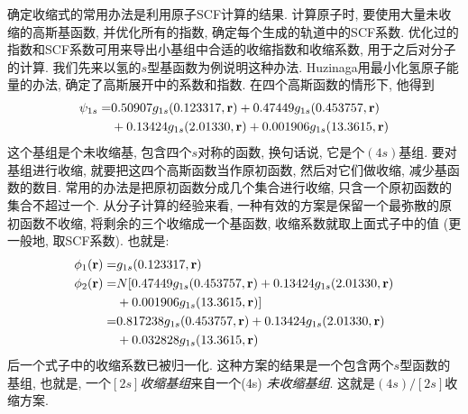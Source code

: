 {确定收缩式的常用办法是利用原子SCF计算的结果. 计算原子时, 要使用大量未收缩的高斯基函数, 并优化所有的指数, 确定每个生成的轨道中的SCF系数. 优化过的指数和SCF系数可用来导出小基组中合适的收缩指数和收缩系数, 用于之后对分子的计算. 我们先来以氢的$s$型基函数为例说明这种办法. Huzinaga用最小化氢原子能量的办法, 确定了高斯展开中的系数和指数. 在四个高斯函数的情形下, 他得到
\begin{align}
\psi_{1s} = &   0.50907g_{1s}(0.123317,\mathbf{r}) + 0.47449 g_{1s}(0.453757,\mathbf{r}) \notag\\
            & + 0.13424 g_{1s}(2.01330,\mathbf{r}) + 0.001906 g_{1s}(13.3615,\mathbf{r})
\end{align}
这个基组是个未收缩基, 包含四个$s$对称的函数, 换句话说, 它是个$(4s)$基组. 要对基组进行收缩, 就要把这四个高斯函数当作原初函数, 然后对它们做收缩, 减少基函数的数目. 常用的办法是把原初函数分成几个集合进行收缩, 只含一个原初函数的集合不超过一个. 从分子计算的经验来看, 一种有效的方案是保留一个最弥散的原初函数不收缩, 将剩余的三个收缩成一个基函数, 收缩系数就取上面式子中的值 (更一般地, 取SCF系数). 也就是:
\begin{align}
\phi_1(\mathbf{r}) = & g_{1s}(0.123317,\mathbf{r})\\
\phi_2(\mathbf{r}) = & N[0.47449g_{1s}(0.453757,\mathbf{r})+ 0.13424 g_{1s}(2.01330,\mathbf{r}) \notag\\
             & + 0.001906 g_{1s}(13.3615,\mathbf{r})]\\
             = & 0.817238g_{1s}(0.453757,\mathbf{r})+ 0.13424 g_{1s}(2.01330,\mathbf{r})\\
             & +0.032828 g_{1s}(13.3615,\mathbf{r})
\end{align}
后一个式子中的收缩系数已被归一化. 这种方案的结果是一个包含两个$s$型函数的基组, 也就是, 一个\emph{$[2s]$收缩基组}来自一个(4s) \emph{未收缩基组}. 这就是$(4s)/[2s]$收缩方案.

}
